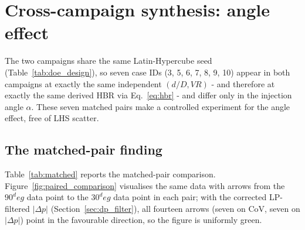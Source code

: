 \documentclass[11pt,a4paper]{article}
\def\dD{d/D}%
\def\VR{VR}%
\def\HBR{HBR}%
\def\CoV{CoV}%
\def\circ{ deg}%
\newcommand{\dD}{\ensuremath{d/D}}
\newcommand{\VR}{\ensuremath{\mathrm{VR}}}
\newcommand{\HBR}{\ensuremath{\mathrm{HBR}}}
\newcommand{\CoV}{\ensuremath{\mathrm{CoV}}}
\begin{document}
\section{Cross-campaign synthesis: angle effect}
\label{sec:cross}

The two campaigns share the same Latin-Hypercube seed
(Table~\ref{tab:doe_design}), so seven case IDs (3, 5, 6, 7, 8, 9,
10) appear in both campaigns at exactly the same independent
\((\dD,\VR)\) - and therefore at exactly the same derived
\HBR{} via Eq.~\ref{eq:hbr} - and differ only in the injection
angle \(\alpha\). These seven matched pairs make a controlled
experiment for the angle effect, free of LHS scatter.

\subsection{The matched-pair finding}
\label{sec:cross_pairs}
Table~\ref{tab:matched} reports the matched-pair comparison.
Figure~\ref{fig:paired_comparison} visualises the same data with
arrows from the \(90^\circ\) data point to the \(30^\circ\) data
point in each pair; with the corrected
LP-filtered \(|\Delta p|\) (Section~\ref{sec:dp_filter}), all
fourteen arrows (seven on \CoV{}, seven on \(|\Delta p|\)) point
in the favourable direction, so the figure is uniformly green.
\end{document}
